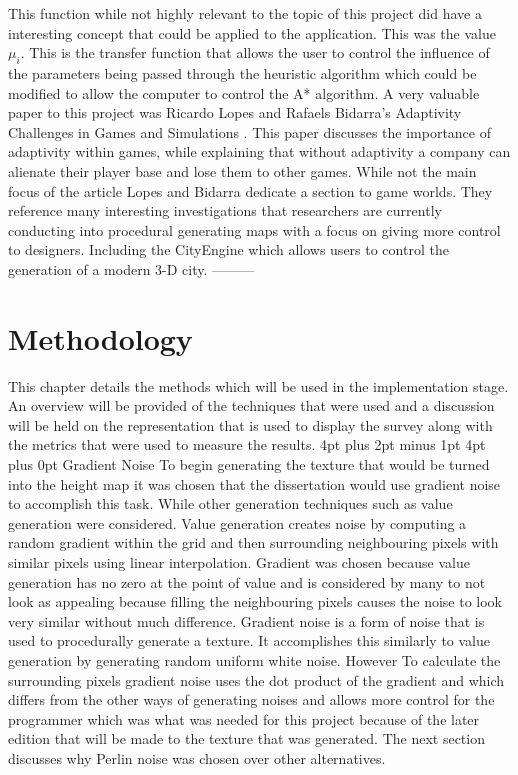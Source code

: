 \documentclass[12pt,a4paper,oneside]{book}
\makeatletter
\renewcommand\section{\@startsection {section}{1}{0mm} %
                               {4pt plus 2pt minus 1pt} %
                               {4pt plus 0pt} %
                               {\bfseries}}
\makeatother
\begin{document}
This function while not highly relevant to the topic of this project did have a interesting concept that could be applied to the application. This was the value \(\mu_i\). This is the transfer function that allows the user to control the influence of the parameters being passed through the heuristic algorithm which could be modified to allow the computer to control the A* algorithm. 
\vspace{5mm} 
\newline
A very valuable paper to this project was Ricardo Lopes and Rafaels Bidarra's Adaptivity Challenges in Games and Simulations \cite{Fun}. This paper discusses the importance of adaptivity within games, while explaining that without adaptivity a company can alienate their player base and lose them to other games. While not the main focus of the article Lopes and Bidarra dedicate a section to game worlds. They reference many interesting investigations that researchers are currently conducting into procedural generating maps with a focus on giving more control to designers. Including the CityEngine which allows users to control the generation of a modern 3-D city.   ---------
\chapter{Methodology}
This chapter details the methods which will be used in the implementation stage. An overview will be provided of the techniques that were used and a discussion will be held on the representation that is used to display the survey along with the metrics that were used to measure the results.
\section{Gradient Noise}
To begin generating the texture that would be turned into the height map it was chosen that the dissertation would use gradient noise to accomplish this task. While other generation techniques such as value generation were considered. Value generation creates noise by computing a random gradient within the grid and then surrounding neighbouring pixels with similar pixels using linear interpolation. Gradient was chosen because value generation has no zero at the point of value and is considered by many to not look as appealing because filling the neighbouring pixels causes the noise to look very similar without much difference.
\vspace{5mm} 
\newline
Gradient noise is a form of noise that is used to procedurally generate a texture. It accomplishes this similarly to value generation by generating random uniform white noise. However To calculate the surrounding pixels gradient noise uses the dot product of the gradient and which differs from the other ways of generating noises and allows more control for the programmer which was what was needed for this project because of the later edition that will be made to the texture that was generated. The next section discusses why Perlin noise was chosen over other alternatives. 
\end{document}

